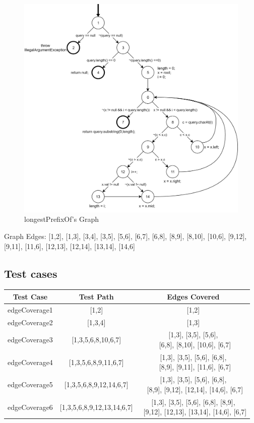 \documentclass[12pt]{article}
\begin{document}
\begin{figure}[!htbp]
  	\centering
  	\includegraphics[scale=0.15]{longestPrefixOfGraph.png}
  	\caption{longestPrefixOf's Graph}
\end{figure}

Graph Edges: [1,2], [1,3], [3,4], [3,5], [5,6], [6,7], [6,8], [8,9], [8,10], [10,6], [9,12], [9,11], [11,6], [12,13], [12,14], [13,14], [14,6]

\newpage
\subsection{Test cases}
\begin{table}[!htbp]
\centering
\begin{tabular}{| c | c | c |} 
 \hline
 Test Case & Test Path & Edges Covered\\ \hline
 edgeCoverage1 & [1,2] & [1,2] \\ \hline
 edgeCoverage2 & [1,3,4] & [1,3] \\ \hline
 edgeCoverage3 & [1,3,5,6,8,10,6,7] & \makecell{[1,3], [3,5], [5,6], \\\ [6,8], [8,10], [10,6], [6,7]} \\ \hline
 edgeCoverage4 & [1,3,5,6,8,9,11,6,7] & \makecell{[1,3], [3,5], [5,6], [6,8],\\\ [8,9], [9,11], [11,6], [6,7]} \\ \hline
 edgeCoverage5 & [1,3,5,6,8,9,12,14,6,7] & \makecell{[1,3], [3,5], [5,6], [6,8],\\\ [8,9], [9,12], [12,14], [14,6], [6,7]} \\ \hline
 edgeCoverage6 & [1,3,5,6,8,9,12,13,14,6,7] & \makecell{[1,3], [3,5], [5,6], [6,8], [8,9],\\\ [9,12], [12,13], [13,14], [14,6], [6,7]} \\ \hline
\end{tabular}
\end{table}
\end{document}
